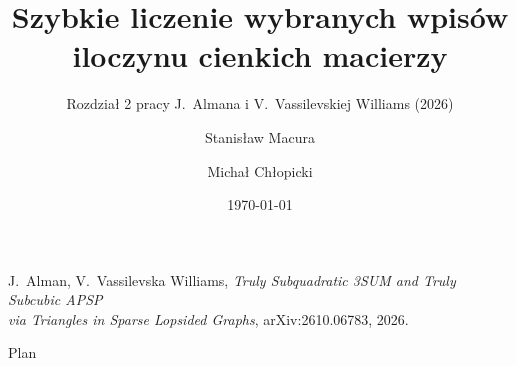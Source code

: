 \documentclass[aspectratio=169,10pt,t]{beamer}
\title[Rozdział 2: wybrane wpisy iloczynu cienkich macierzy]{Szybkie liczenie wybranych wpisów\\ iloczynu cienkich macierzy}
\subtitle{Rozdział 2 pracy J.~Almana i V.~Vassilevskiej Williams (2026)}
\author[S.~Macura, M.~Chłopicki]{Stanisław Macura \and Michał Chłopicki}
\date{\today}
\theoremstyle{plain}
\theoremstyle{definition}
\theoremstyle{example}
\begin{document}
\begin{frame}[c]
  \titlepage
  \footnotesize\centering
  J.~Alman, V.~Vassilevska Williams, \emph{Truly Subquadratic 3SUM and Truly Subcubic APSP\\
  via Triangles in Sparse Lopsided Graphs}, arXiv:2610.06783, 2026.
\end{frame}

\begin{frame}{Plan}
  \tableofcontents[hideallsubsections]
\end{frame}








\end{document}
